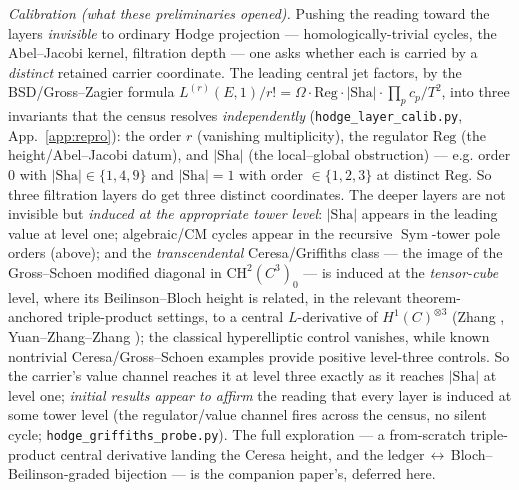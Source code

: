 \documentclass[11pt]{article}
\theoremstyle{definition}
\newcommand{\Sym}{\operatorname{Sym}}
\newcommand{\Sha}{\mathrm{Sha}}
\begin{document}
\emph{Calibration (what these preliminaries opened).} Pushing the reading toward the layers
\emph{invisible} to ordinary Hodge projection --- homologically-trivial cycles, the Abel--Jacobi kernel,
filtration depth --- one asks whether each is carried by a \emph{distinct} retained carrier coordinate.
The leading central jet factors, by the BSD/Gross--Zagier formula
$L^{(r)}(E,1)/r!=\Omega\cdot\mathrm{Reg}\cdot|\Sha|\cdot\prod_p c_p/T^2$, into three invariants that the
census resolves \emph{independently} (\texttt{hodge\_layer\_calib.py}, App.~\ref{app:repro}): the order
$r$ (vanishing multiplicity), the regulator $\mathrm{Reg}$ (the height/Abel--Jacobi datum),
and $|\Sha|$ (the local--global obstruction) --- e.g. order $0$ with $|\Sha|\in\{1,4,9\}$ and
$|\Sha|=1$ with order $\in\{1,2,3\}$ at distinct $\mathrm{Reg}$. So three filtration layers do get three
distinct coordinates. The deeper layers are not invisible but \emph{induced at the appropriate tower
level}: $|\Sha|$ appears in the leading value at level one; algebraic/CM cycles appear in the recursive
$\Sym$-tower pole orders (above); and the \emph{transcendental} Ceresa/Griffiths class --- the image of the
Gross--Schoen modified diagonal in $\mathrm{CH}^2(C^3)_0$ --- is induced at the \emph{tensor-cube} level,
where its Beilinson--Bloch height is related, in the relevant theorem-anchored triple-product settings, to
a central $L$-derivative of $H^1(C)^{\otimes 3}$ (Zhang \cite{ZhangGS}, Yuan--Zhang--Zhang \cite{YZZ}); the
classical hyperelliptic control vanishes, while known nontrivial Ceresa/Gross--Schoen examples provide
positive level-three controls. So the carrier's value channel
reaches it at level three exactly as it reaches $|\Sha|$ at level one; \emph{initial results appear to
affirm} the reading that every layer is induced at some tower level (the regulator/value channel fires
across the census, no silent cycle; \texttt{hodge\_griffiths\_probe.py}). The full exploration --- a
from-scratch triple-product central derivative landing the Ceresa height, and the ledger$\,\leftrightarrow\,$Bloch--Beilinson-graded
bijection --- is the companion paper's, deferred here.
\end{document}
